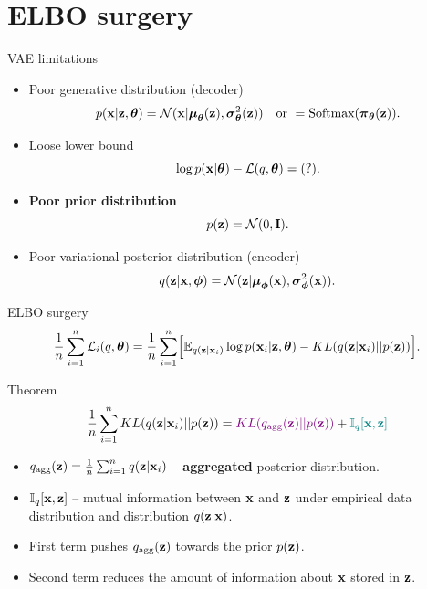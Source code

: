 \section{ELBO surgery}
\begin{frame}{VAE limitations}
	\begin{itemize}
		\item Poor generative distribution (decoder)
		\[
			p(\mathbf{x} | \mathbf{z}, \boldsymbol{\theta}) = \mathcal{N}(\mathbf{x}| \boldsymbol{\mu}_{\boldsymbol{\theta}}(\mathbf{z}), \boldsymbol{\sigma}^2_{\boldsymbol{\theta}}(\mathbf{z})) \quad \text{or } = \text{Softmax}(\boldsymbol{\pi}_{\boldsymbol{\theta}}(\mathbf{z})).
		\]
		\item Loose lower bound
		\[
			\log p(\mathbf{x} | \boldsymbol{\theta}) - \mathcal{L}(q, \boldsymbol{\theta}) = (?).
		\]
		\item \textbf{Poor prior distribution}
		\[
			p(\mathbf{z}) = \mathcal{N}(0, \mathbf{I}).
		\]
		\item Poor variational posterior distribution (encoder)
		\[
			q(\mathbf{z} | \mathbf{x}, \boldsymbol{\phi}) = \mathcal{N}(\mathbf{z}| \boldsymbol{\mu}_{\boldsymbol{\phi}}(\mathbf{x}), \boldsymbol{\sigma}^2_{\boldsymbol{\phi}}(\mathbf{x})).
		\]
	\end{itemize}
\end{frame}
\begin{frame}{ELBO surgery}
	\vspace{-0.3cm}
	\[
	    \frac{1}{n} \sum_{i=1}^n \mathcal{L}_i(q, \boldsymbol{\theta}) = \frac{1}{n} \sum_{i=1}^n \Bigl[ \mathbb{E}_{q(\mathbf{z} | \mathbf{x}_i)} \log p(\mathbf{x}_i | \mathbf{z}, \boldsymbol{\theta}) - KL(q(\mathbf{z} | \mathbf{x}_i) || p(\mathbf{z})) \Bigr].
	\]
	\vspace{-0.3cm}
	\begin{block}{Theorem}
		\[
		    \frac{1}{n} \sum_{i=1}^n KL(q(\mathbf{z} | \mathbf{x}_i) || p(\mathbf{z})) = {\color{violet} KL(q_{\text{agg}}(\mathbf{z}) || p(\mathbf{z}))} + {\color{teal}\mathbb{I}_{q} [\mathbf{x}, \mathbf{z}]}
		\]
		\begin{itemize}
			\item $q_{\text{agg}}(\mathbf{z}) = \frac{1}{n} \sum_{i=1}^n q(\mathbf{z} | \mathbf{x}_i)$ -- \textbf{aggregated} posterior distribution.
			\item $\mathbb{I}_{q} [\mathbf{x}, \mathbf{z}]$ -- mutual information between $\mathbf{x}$ and $\mathbf{z}$ under empirical data distribution and distribution $q(\mathbf{z} | \mathbf{x})$.
			\item  {\color{violet} First term} pushes $q_{\text{agg}}(\mathbf{z})$ towards the prior $p(\mathbf{z})$.
			\item {\color{teal}Second term} reduces the amount of	information about $\mathbf{x}$ stored in $\mathbf{z}$. 
		\end{itemize}
	\end{block}
\end{frame}
